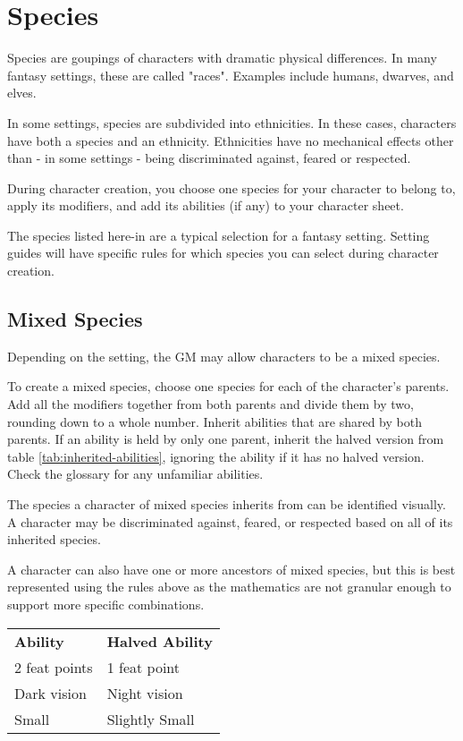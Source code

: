 \chapter{Species}\label{species}

\begin{multicols*}{2}
    Species are goupings of characters with dramatic physical differences. In many
    fantasy settings, these are called "races". Examples include humans, dwarves,
    and elves.

    In some settings, species are subdivided into ethnicities. In these cases,
    characters have both a species and an ethnicity. Ethnicities have no mechanical
    effects other than - in some settings - being discriminated against, feared or
    respected.

    During character creation, you choose one species for your character to belong
    to, apply its modifiers, and add its abilities (if any) to your character
    sheet.

    The species listed here-in are a typical selection for a fantasy setting.
    Setting guides will have specific rules for which species you can select
    during character creation.

    \section{Mixed Species}

    Depending on the setting, the GM may allow characters to be a mixed species.

    To create a mixed species, choose one species for each of the character's
    parents. Add all the modifiers together from both parents and divide them
    by two, rounding down to a whole number. Inherit abilities that are shared by
    both parents. If an ability is held by only one parent, inherit the halved
    version from table \ref{tab:inherited-abilities}, ignoring the ability if
    it has no halved version. Check the glossary for
    any unfamiliar abilities.

    The species a character of mixed species inherits from can be identified
    visually. A character may be discriminated against, feared, or respected
    based on all of its inherited species.

    A character can also have one or more ancestors of mixed species, but this is
    best represented using the rules above as the mathematics are not granular
    enough to support more specific combinations.
    {
        \unclassedrowcolors
        \begin{tabularx}{0.5\textwidth}{l X}
            \textbf{Ability} & \textbf{Halved Ability} \\
            2 feat points & 1 feat point \\
            Dark vision & Night vision \\
            Small & Slightly Small \\
        \end{tabularx}
        \label{tab:inherited-abilities}
    }


\end{multicols*}
